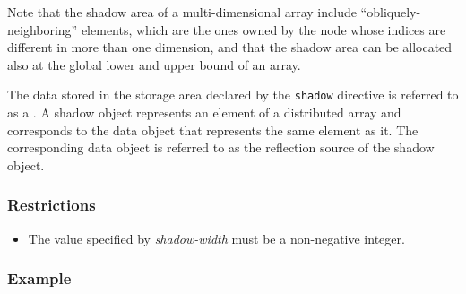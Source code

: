 Note that the shadow area of a multi-dimensional array include
``obliquely-neighboring'' elements, which are the ones owned by the node 
whose indices are different in more than one dimension, and that the
shadow area can be allocated also at the global lower and upper bound of
an array.

The data stored in the storage area declared by the {\tt shadow}
directive is referred to as a .
%
A shadow object represents an element of a distributed array and 
corresponds to the data object that represents the same
element as it. The corresponding data object is referred to as the
reflection source of the shadow object.



\subsubsection*{Restrictions}

\begin{itemize}
\item The value specified by {\it shadow-width} must be a non-negative
      integer.
\end{itemize}

\subsubsection*{Example}

